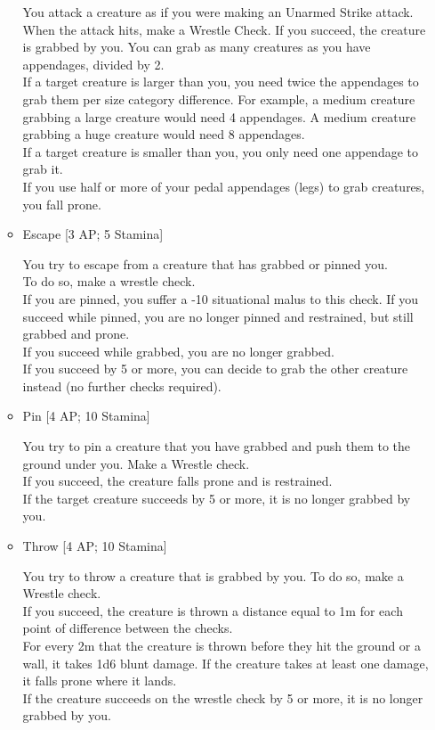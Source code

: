 \begin{itemize}
\begin{itemize}
        You attack a creature as if you were making an Unarmed Strike attack.\\
        When the attack hits, make a Wrestle Check.
        If you succeed, the creature is grabbed by you.
        You can grab as many creatures as you have appendages, divided by 2.\\
        If a target creature is larger than you, you need twice the appendages to grab them per size category difference.
        For example, a medium creature grabbing a large creature would need 4 appendages.
        A medium creature grabbing a huge creature would need 8 appendages.\\
        If a target creature is smaller than you, you only need one appendage to grab it.\\
        If you use half or more of your pedal appendages (legs) to grab creatures, you fall prone.

    \item Escape [3 AP; 5 Stamina]

        You try to escape from a creature that has grabbed or pinned you.\\
        To do so, make a wrestle check.\\
        If you are pinned, you suffer a -10 situational malus to this check.
        If you succeed while pinned, you are no longer pinned and restrained, but still grabbed and prone.\\
        If you succeed while grabbed, you are no longer grabbed.\\
        If you succeed by 5 or more, you can decide to grab the other creature instead (no further checks required).

    \item Pin [4 AP; 10 Stamina]

        You try to pin a creature that you have grabbed and push them to the ground under you.
        Make a Wrestle check.\\
        If you succeed, the creature falls prone and is restrained.\\
        If the target creature succeeds by 5 or more, it is no longer grabbed by you.

    \item Throw [4 AP; 10 Stamina]

        You try to throw a creature that is grabbed by you.
        To do so, make a Wrestle check.\\
        If you succeed, the creature is thrown a distance equal to 1m for each point of difference between the checks.\\
        For every 2m that the creature is thrown before they hit the ground or a wall, it takes 1d6 blunt damage.
        If the creature takes at least one damage, it falls prone where it lands.\\
        If the creature succeeds on the wrestle check by 5 or more, it is no longer grabbed by you.


\end{itemize}
\end{itemize}
